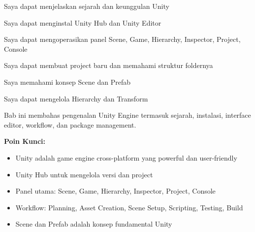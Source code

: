 \documentclass[../main]{subfiles}
\begin{document}

\begin{checklist}
  \item Saya dapat menjelaskan sejarah dan keunggulan Unity
  \item Saya dapat menginstal Unity Hub dan Unity Editor
  \item Saya dapat mengoperasikan panel Scene, Game, Hierarchy, Inspector, Project, Console
  \item Saya dapat membuat project baru dan memahami struktur foldernya
  \item Saya memahami konsep Scene dan Prefab
  \item Saya dapat mengelola Hierarchy dan Transform
\end{checklist}


\begin{rangkuman}
Bab ini membahas pengenalan Unity Engine termasuk sejarah, instalasi, interface editor, workflow, dan package management.

\textbf{Poin Kunci:}
\begin{itemize}
  \item Unity adalah game engine cross-platform yang powerful dan user-friendly
  \item Unity Hub untuk mengelola versi dan project
  \item Panel utama: Scene, Game, Hierarchy, Inspector, Project, Console
  \item Workflow: Planning, Asset Creation, Scene Setup, Scripting, Testing, Build
  \item Scene dan Prefab adalah konsep fundamental Unity
\end{itemize}
\end{rangkuman}

\ifSubfilesClassLoaded{
  \renewcommand{\bibname}{Daftar Pustaka}
  
  
}{}
\end{document}
